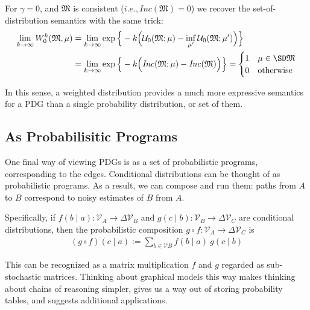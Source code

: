 \documentclass{article}
\theoremstyle{plain}
\theoremstyle{definition}
\theoremstyle{remark}
\newcommand{\note}[1]{{\color{blue}\ \!\Large\smash{\textbf{[}}{\normalsize\textsc{note:} #1}\ \!\smash{\textbf{]}}}}
\newcommand{\dg}[1]{\mathfrak{#1}}
\newcommand\Inc{\mathit{Inc}}
\numberwithin{equation}{section}
\begin{document}
{	For $\gamma = 0$, and $\dg M$ is consistent ($i.e., \Inc(\dg M) = 0$) we recover the set-of-distribution semantics with the same trick:
	\begin{align*}
		 \lim_{k \to \infty} W_0^k(\dg M, \mu)
		&= \lim_{k \to \infty} \exp\Big\{-k \Big(\mathcal U_0(\dg M;\mu) - \inf_{\mu'} \mathcal U_0(\dg M; \mu')\Big) \Big\} \\
		&= \lim_{k \to \infty} \exp\Big\{-k \Big(\Inc(\dg M;\mu) - \Inc(\dg M)\Big) \Big\} 
		= \begin{cases}
			1 & \mu \in \SD\dg M \\
			0 & \text{otherwise}
		\end{cases} 
	\end{align*}

	In this sense, a weighted distribution provides a much more expressive semantics for a PDG than a single probability distribution, or set of them.

	\begin{vleftovers}
	\subsection{As Probabilisitic Programs}\label{sec:prog-semantics}
	
	One final way of viewing PDGs is as a set of probabilistic programs, corresponding to the edges. 
	Conditional distributions can be thought of as probabilistic programs. As a result, we can compose and run them: paths from $A$ to $B$ correspond to noisy estimates of $B$ from $A$.
	
	Specifically, if $f(b \mid a) : \mathcal V_A \to \Delta \mathcal V_B$ and $g(c \mid b) : \mathcal V_B \to \Delta \mathcal V_C$ are conditional distributions, then the probabilistic composition $g\circ f : \mathcal V_A \to \Delta\mathcal V_C$ is
	\begin{align*}
		(g\circ  f) (c \mid a) :=  \sum_{b \in \mathcal V B}\!\! f (b \mid a)\ g(c \mid b)
	\end{align*}
	
	This can be recognized as a matrix multiplication $f$ and $g$ regarded as sub-stochastic matrices.
	Thinking about graphical models this way makes thinking about chains of reasoning simpler, gives us a way out of storing probability tables, and suggests additional applications.
	

\end{vleftovers}}
\end{document}
